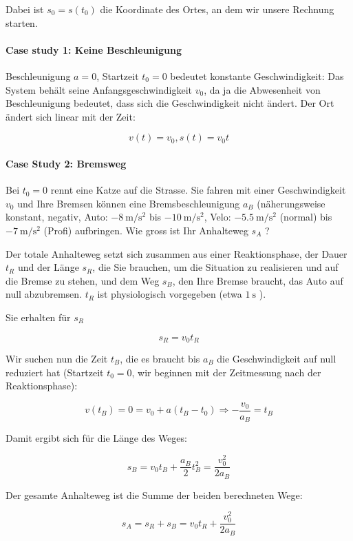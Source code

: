 Dabei ist $s_{0}=s\left(t_{0}\right)$ die Koordinate des Ortes, an dem wir unsere Rechnung starten.

\paragraph*{Case study 1: Keine Beschleunigung}
Beschleunigung $a=0$, Startzeit $t_{0}=0$ bedeutet konstante Geschwindigkeit: Das System behält seine Anfangsgeschwindigkeit $v_{0}$, da ja die Abwesenheit von Beschleunigung bedeutet, dass sich die Geschwindigkeit nicht ändert. Der Ort ändert sich linear mit der Zeit:

$$
v(t)=v_{0}, s(t)=v_{0} t
$$

\paragraph*{Case Study 2: Bremsweg}
Bei $t_{0}=0$ rennt eine Katze auf die Strasse. Sie fahren mit einer Geschwindigkeit $v_{0}$ und Ihre Bremsen können eine Bremsbeschleunigung $a_{B}$ (näherungsweise konstant, negativ, Auto: $-8 \mathrm{~m} / \mathrm{s}^{2}$ bis $-10 \mathrm{~m} / \mathrm{s}^{2}$, Velo: $-5.5 \mathrm{~m} / \mathrm{s}^{2}$ (normal) bis $-7 \mathrm{~m} / \mathrm{s}^{2}$ (Profi) aufbringen. Wie gross ist Ihr Anhalteweg $s_{A}$ ?

Der totale Anhalteweg setzt sich zusammen aus einer Reaktionsphase, der Dauer $t_{R}$ und der Länge $s_{R}$, die Sie brauchen, um die Situation zu realisieren und auf die Bremse zu stehen, und dem Weg $s_{B}$, den Ihre Bremse braucht, das Auto auf null abzubremsen. $t_{R}$ ist physiologisch vorgegeben (etwa $1 \mathrm{~s}$ ).

Sie erhalten für $s_{R}$

$$
s_{R}=v_{0} t_{R}
$$

Wir suchen nun die Zeit $t_{B}$, die es braucht bis $a_{B}$ die Geschwindigkeit auf null reduziert hat (Startzeit $t_{0}=0$, wir beginnen mit der Zeitmessung nach der Reaktionsphase):

$$
v\left(t_{B}\right)=0=v_{0}+a\left(t_{B}-t_{0}\right) \Rightarrow-\frac{v_{0}}{a_{B}}=t_{B}
$$

Damit ergibt sich für die Länge des Weges:

$$
s_{B}=v_{0} t_{B}+\frac{a_{B}}{2} t_{B}^{2}=\frac{v_{0}^{2}}{2 a_{B}}
$$

Der gesamte Anhalteweg ist die Summe der beiden berechneten Wege:

$$
s_{A}=s_{R}+s_{B}=v_{0} t_{R}+\frac{v_{0}^{2}}{2 a_{B}}
$$

